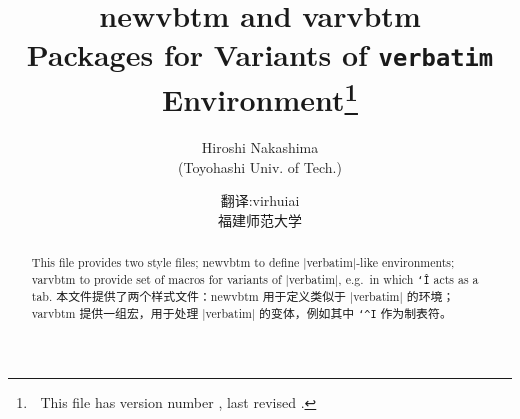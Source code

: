 \title{\textsf{newvbtm} and \textsf{varvbtm}\\
	Packages for Variants of \texttt{verbatim} Environment\thanks{
	This file has version number \fileversion, last revised \filedate.}}
\author{Hiroshi Nakashima\\(Toyohashi Univ. of Tech.)\and 翻译:virhuiai\\福建师范大学}
\date{\filedate}
\maketitle

\begin{abstract}
\begin{paracol}{2}
\noindent
This file provides two style files; \textsf{newvbtm} to define
|verbatim|-like environments; \textsf{varvbtm} to provide set of macros
for variants of |verbatim|, e.g.\ in which \texttt{\char`\^I} acts as a tab.    
\switchcolumn
\noindent
本文件提供了两个样式文件：\textsf{newvbtm} 用于定义类似于 |verbatim| 的环境；\textsf{varvbtm} 提供一组宏，用于处理 |verbatim| 的变体，例如其中 \texttt{\char`^I} 作为制表符。
\end{paracol}    
\end{abstract}

\tableofcontents
\newpage
